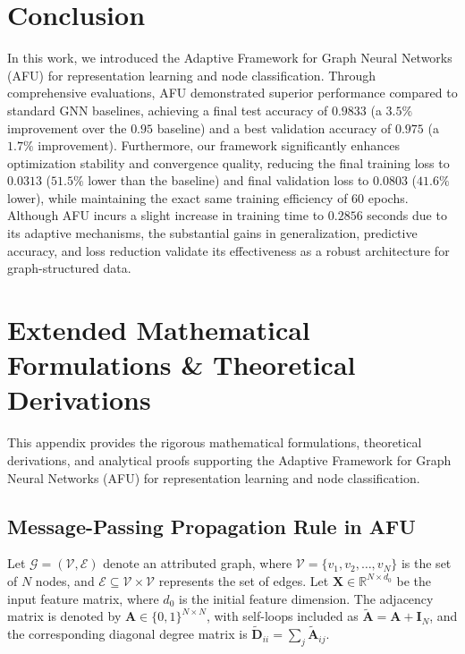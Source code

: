 \documentclass[10pt,twocolumn]{article}
\begin{document}
\section{Conclusion}
In this work, we introduced the Adaptive Framework for Graph Neural Networks (\textsc{AFU}) for representation learning and node classification. Through comprehensive evaluations, \textsc{AFU} demonstrated superior performance compared to standard GNN baselines, achieving a final test accuracy of $0.9833$ (a $3.5\%$ improvement over the $0.95$ baseline) and a best validation accuracy of $0.975$ (a $1.7\%$ improvement). Furthermore, our framework significantly enhances optimization stability and convergence quality, reducing the final training loss to $0.0313$ ($51.5\%$ lower than the baseline) and final validation loss to $0.0803$ ($41.6\%$ lower), while maintaining the exact same training efficiency of 60 epochs. Although \textsc{AFU} incurs a slight increase in training time to $0.2856$ seconds due to its adaptive mechanisms, the substantial gains in generalization, predictive accuracy, and loss reduction validate its effectiveness as a robust architecture for graph-structured data.




\clearpage
\appendix
\section{Extended Mathematical Formulations \& Theoretical Derivations}
\begin{appendices}

\end{appendices}

This appendix provides the rigorous mathematical formulations, theoretical derivations, and analytical proofs supporting the Adaptive Framework for Graph Neural Networks (\textsc{AFU}) for representation learning and node classification. 

\subsection{Message-Passing Propagation Rule in \textsc{AFU}}

Let $\mathcal{G} = (\mathcal{V}, \mathcal{E})$ denote an attributed graph, where $\mathcal{V} = \{v_1, v_2, \dots, v_N\}$ is the set of $N$ nodes, and $\mathcal{E} \subseteq \mathcal{V} \times \mathcal{V}$ represents the set of edges. Let $\mathbf{X} \in \mathbb{R}^{N \times d_0}$ be the input feature matrix, where $d_0$ is the initial feature dimension. The adjacency matrix is denoted by $\mathbf{A} \in \{0, 1\}^{N \times N}$, with self-loops included as $\tilde{\mathbf{A}} = \mathbf{A} + \mathbf{I}_N$, and the corresponding diagonal degree matrix is $\tilde{\mathbf{D}}_{ii} = \sum_{j} \tilde{\mathbf{A}}_{ij}$.
\end{document}
